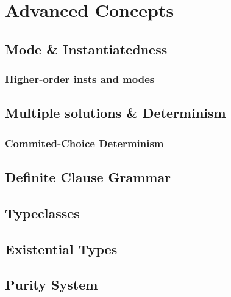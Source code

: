 \chapter{Advanced Concepts}

\section{Mode \& Instantiatedness}

\subsection{Higher-order insts and modes}

\section{Multiple solutions \& Determinism}

\subsection{Commited-Choice Determinism}

\section{Definite Clause Grammar}

\section{Typeclasses}

\section{Existential Types}

\section{Purity System}




